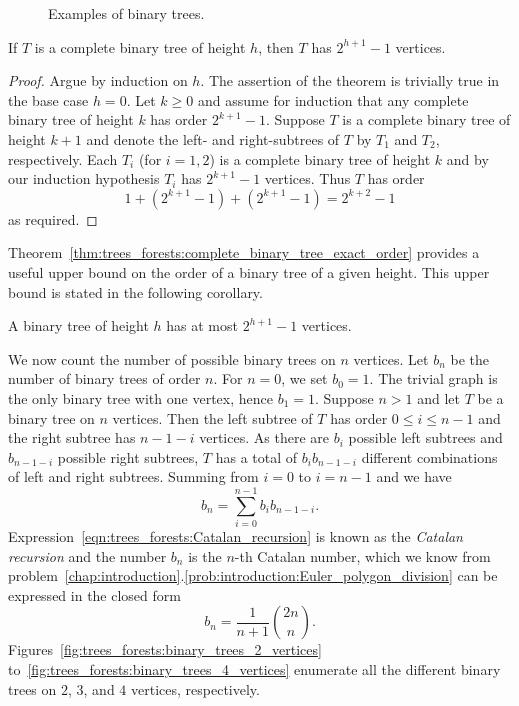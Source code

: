 \begin{figure}[!htbp]
\centering

\caption{Examples of binary trees.}
\label{fig:trees_forests:examples_binary_trees}
\end{figure}

\begin{theorem}
\label{thm:trees_forests:complete_binary_tree_exact_order}
If $T$ is a complete binary tree of height $h$, then $T$ has
$2^{h+1} - 1$ vertices.
\end{theorem}

\begin{proof}
Argue by induction on $h$. The assertion of the theorem is trivially
true in the base case $h = 0$. Let $k \geq 0$ and assume for induction
that any complete binary tree of height $k$ has order $2^{k+1} - 1$.
Suppose $T$ is a complete binary tree of height $k + 1$ and denote the
left- and right-subtrees of $T$ by $T_1$ and $T_2$, respectively. Each
$T_i$ (for $i = 1,2$) is a complete binary tree of height $k$ and by
our induction hypothesis $T_i$ has $2^{k+1} - 1$ vertices. Thus $T$
has order
\[
1 + (2^{k+1} - 1) + (2^{k+1} - 1)
=
2^{k+2} - 1
\]
as required.
\end{proof}

Theorem~\ref{thm:trees_forests:complete_binary_tree_exact_order}
provides a useful upper bound on the order of a binary tree of a given
height. This upper bound is stated in the following corollary.

\begin{corollary}
A binary tree of height $h$ has at most $2^{h+1} - 1$ vertices.
\end{corollary}

We now count the number of possible binary trees on $n$
vertices. Let $b_n$ be the number of binary trees of order $n$. For
$n = 0$, we set $b_0 = 1$. The trivial graph is the only binary tree
with one vertex, hence $b_1 = 1$. Suppose $n > 1$ and let $T$ be a
binary tree on $n$ vertices. Then the left subtree of $T$ has order
$0 \leq i \leq n - 1$ and the right subtree has $n - 1 - i$
vertices. As there are $b_i$ possible left subtrees and $b_{n-1-i}$
possible right subtrees, $T$ has a total of $b_i b_{n-1-i}$ different
combinations of left and right subtrees. Summing from $i = 0$ to
$i = n - 1$ and we have
\begin{equation}
\label{eqn:trees_forests:Catalan_recursion}
b_n
=
\sum_{i=0}^{n-1} b_i b_{n-1-i}.
\end{equation}
Expression~\eqref{eqn:trees_forests:Catalan_recursion} is known as the
\emph{Catalan recursion} and the number $b_n$ is the $n$-th Catalan
number, which we know from
problem~\ref{chap:introduction}.\ref{prob:introduction:Euler_polygon_division}
can be expressed in the closed form
\[
b_n
=
\frac{1}{n+1} \binom{2n}{n}.
\]
Figures~\ref{fig:trees_forests:binary_trees_2_vertices}
to~\ref{fig:trees_forests:binary_trees_4_vertices} enumerate all the
different binary trees on $2$, $3$, and $4$ vertices, respectively.

